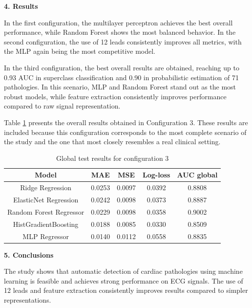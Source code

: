 \documentclass[12pt,a4paper,twoside]{book}
\begin{document}
\vspace{0.5cm}

\noindent \large \textbf{4. Results}
\vspace{0.3cm}

In the first configuration, the multilayer perceptron achieves the best overall performance, while Random Forest shows the most balanced behavior. 
In the second configuration, the use of 12 leads consistently improves all metrics, with the MLP again being the most competitive model.

In the third configuration, the best overall results are obtained, reaching up to 0.93 AUC in superclass classification and 0.90 in probabilistic estimation of 71 pathologies. 
In this scenario, MLP and Random Forest stand out as the most robust models, while feature extraction consistently improves performance compared to raw signal representation.

Table \ref{tab:analisis-global-config3-abstract} presents the overall results obtained in Configuration 3. 
These results are included because this configuration corresponds to the most complete scenario of the study and the one that most closely resembles a real clinical setting.

\begin{table}[H]
	\centering
	\begin{tabular}{|c|c|c|c|c|}
	\hline
	\textbf{Model} & \textbf{MAE} & \textbf{MSE} & \textbf{Log-loss} & \textbf{AUC global} \\
	\hline
	Ridge Regression            & 0.0253 & 0.0097 & 0.0392 & 0.8808 \\
	ElasticNet Regression       & 0.0242 & 0.0098 & 0.0373 & 0.8887 \\
	Random Forest Regressor     & 0.0229 & 0.0098 & 0.0358 & 0.9002 \\
	HistGradientBoosting        & 0.0188 & 0.0085 & 0.0330 & 0.8509 \\
	MLP Regressor               & 0.0140 & 0.0112 & 0.0558 & 0.8835 \\
	\hline
	\end{tabular}
	\caption{Global test results for configuration 3}
	\label{tab:analisis-global-config3-abstract}
\end{table}

\vspace{0.5cm}

\noindent \large \textbf{5. Conclusions}
\vspace{0.3cm}

The study shows that automatic detection of cardiac pathologies using machine learning is feasible and achieves strong performance on ECG signals. 
The use of 12 leads and feature extraction consistently improves results compared to simpler representations.
\end{document}
